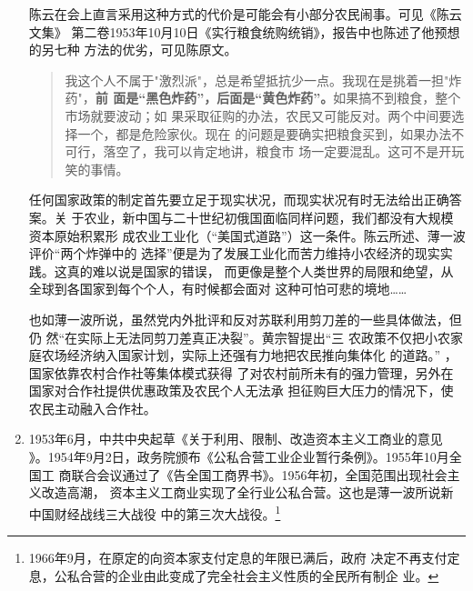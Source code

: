 \begin{enumerate}
  陈云在会上直言采用这种方式的代价是可能会有小部分农民闹事。可见《陈云文集》
  第二卷1953年10月10日《实行粮食统购统销》，报告中也陈述了他预想的另七种
  方法的优劣，可见陈原文。
  \begin{quotation}
    我这个人不属于"激烈派"，总是希望抵抗少一点。我现在是挑着一担"炸药"，\textbf{前
      面是“黑色炸药”，后面是“黄色炸药”。}如果搞不到粮食，整个市场就要波动；如
    果采取征购的办法，农民又可能反对。两个中间要选择一个，都是危险家伙。现在
    的问题是要确实把粮食买到，如果办法不可行，落空了，我可以肯定地讲，粮食市
    场一定要混乱。这可不是开玩笑的事情。
  \end{quotation}
  任何国家政策的制定首先要立足于现实状况，而现实状况有时无法给出正确答案。关
  于农业，新中国与二十世纪初俄国面临同样问题，我们都没有大规模资本原始积累形
  成农业工业化（“美国式道路”）这一条件。陈云所述、薄一波评价“两个炸弹中的
  选择”便是为了发展工业化而苦力维持小农经济的现实实践。这真的难以说是国家的错误，
  而更像是整个人类世界的局限和绝望，从全球到各国家到每个个人，有时候都会面对
  这种可怕可悲的境地……


  也如薄一波所说，虽然党内外批评和反对苏联利用剪刀差的一些具体做法，但仍
  然“在实际上无法同剪刀差真正决裂”。黄宗智提出“三
  农政策不仅把小农家庭农场经济纳入国家计划，实际上还强有力地把农民推向集体化
  的道路。” ，国家依靠农村合作社等集体模式获得
  了对农村前所未有的强力管理，另外在国家对合作社提供优惠政策及农民个人无法承
  担征购巨大压力的情况下，使农民主动融入合作社。

\item 1953年6月，中共中央起草《关于利用、限制、改造资本主义工商业的意见
  》。1954年9月2日，政务院颁布《公私合营工业企业暂行条例》。1955年10月全国工
  商联合会议通过了《告全国工商界书》。1956年初，全国范围出现社会主义改造高潮，
  资本主义工商业实现了全行业公私合营。这也是薄一波所说新中国财经战线三大战役
  中的第三次大战役。\footnote{1966年9月，在原定的向资本家支付定息的年限已满后，政府
    决定不再支付定息，公私合营的企业由此变成了完全社会主义性质的全民所有制企
    业。}




\end{enumerate}
